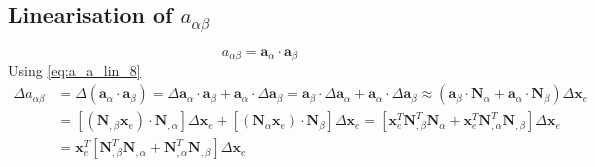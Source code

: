 \subsection{Linearisation of \texorpdfstring{$a_{\alpha \beta}$}{a-ab}} 
\begin{equation}\label{eq:del_aab_1}
    a_{\alpha \beta} = \boldsymbol{a}_{\alpha} \cdot \boldsymbol{a}_{\beta}
\end{equation}
Using \eqref{eq:a_a_lin_8}
\begin{equation}\label{eq:del_aab_2}
    \begin{split}
        \Delta a_{\alpha \beta} &= \Delta \left( \boldsymbol{a}_{\alpha} \cdot \boldsymbol{a}_{\beta} \right) = \Delta \boldsymbol{a}_{\alpha} \cdot \boldsymbol{a}_{\beta} + \boldsymbol{a}_{\alpha} \cdot \Delta \boldsymbol{a}_{\beta} = \boldsymbol{a}_{\beta} \cdot \Delta \boldsymbol{a}_{\alpha} + \boldsymbol{a}_{\alpha} \cdot \Delta \boldsymbol{a}_{\beta} \approx \left( \boldsymbol{a}_{\beta} \cdot \mathbf{N}_{\alpha} + \boldsymbol{a}_{\alpha} \cdot \mathbf{N}_{\beta} \right) \Delta \mathbf{x}_{e} \\ &= \left[ \left( \mathbf{N}_{, \beta} \mathbf{x}_{e} \right) \cdot \mathbf{N}_{, \alpha} \right] \Delta \mathbf{x}_{e} + \left[ \left( \mathbf{N}_{\alpha} \mathbf{x}_{e} \right) \cdot \mathbf{N}_{\beta} \right] \Delta \mathbf{x}_{e} = \left[ \mathbf{x}_{e}^{T} \mathbf{N}_{, \beta}^{T} \mathbf{N}_{\alpha} + \mathbf{x}_{e}^{T} \mathbf{N}_{, \alpha}^{T} \mathbf{N}_{, \beta} \right] \Delta \mathbf{x}_{e} \\ &= \mathbf{x}_{e}^{T} \left[ \mathbf{N}_{, \beta}^{T} \mathbf{N}_{, \alpha} + \mathbf{N}_{, \alpha}^{T} \mathbf{N}_{, \beta} \right] \Delta \mathbf{x}_{e}
    \end{split}
\end{equation}
